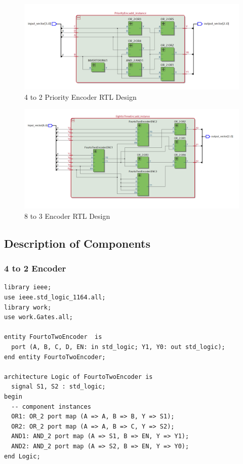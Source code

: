 \documentclass[12pt]{article}
\begin{document}
\begin{figure}[H]
\centering
  \includegraphics[scale=0.3]{Images/PriorityEnc_RTLVIEWER.png}
  \caption{4 to 2 Priority Encoder RTL Design}
\end{figure}

\begin{figure}[H]
\centering
  \includegraphics[scale=0.3]{Images/8to3ENCODER_RTLVIEWER.png}
  \caption{8 to 3 Encoder RTL Design}
\end{figure}

\subsection{Description of Components}
\subsubsection{4 to 2 Encoder}
\begin{verbatim}
library ieee;
use ieee.std_logic_1164.all;
library work;
use work.Gates.all;

entity FourtoTwoEncoder  is
  port (A, B, C, D, EN: in std_logic; Y1, Y0: out std_logic);
end entity FourtoTwoEncoder;

architecture Logic of FourtoTwoEncoder is
  signal S1, S2 : std_logic;
begin
  -- component instances
  OR1: OR_2 port map (A => A, B => B, Y => S1);
  OR2: OR_2 port map (A => A, B => C, Y => S2);
  AND1: AND_2 port map (A => S1, B => EN, Y => Y1);
  AND2: AND_2 port map (A => S2, B => EN, Y => Y0);
end Logic;
\end{verbatim}
\end{document}
